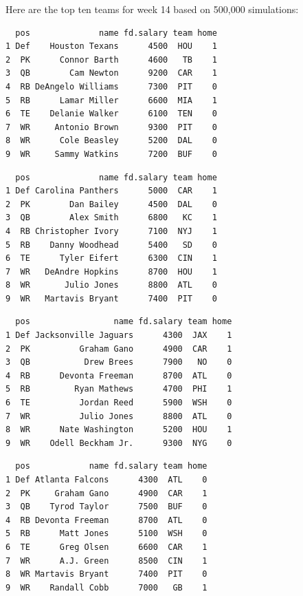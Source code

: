 \documentclass[10pt]{article}
\begin{document}
\thispagestyle{fancy}


\noindent Here are the top ten teams for week 14 based on 500,000 simulations:
\begin{lstlisting}
  pos              name fd.salary team home
1 Def    Houston Texans      4500  HOU    1
2  PK      Connor Barth      4600   TB    1
3  QB        Cam Newton      9200  CAR    1
4  RB DeAngelo Williams      7300  PIT    0
5  RB      Lamar Miller      6600  MIA    1
6  TE    Delanie Walker      6100  TEN    0
7  WR     Antonio Brown      9300  PIT    0
8  WR      Cole Beasley      5200  DAL    0
9  WR     Sammy Watkins      7200  BUF    0
\end{lstlisting}

\begin{lstlisting}
  pos              name fd.salary team home
1 Def Carolina Panthers      5000  CAR    1
2  PK        Dan Bailey      4500  DAL    0
3  QB        Alex Smith      6800   KC    1
4  RB Christopher Ivory      7100  NYJ    1
5  RB    Danny Woodhead      5400   SD    0
6  TE      Tyler Eifert      6300  CIN    1
7  WR   DeAndre Hopkins      8700  HOU    1
8  WR       Julio Jones      8800  ATL    0
9  WR   Martavis Bryant      7400  PIT    0
\end{lstlisting}

\begin{lstlisting}
  pos                 name fd.salary team home
1 Def Jacksonville Jaguars      4300  JAX    1
2  PK          Graham Gano      4900  CAR    1
3  QB           Drew Brees      7900   NO    0
4  RB      Devonta Freeman      8700  ATL    0
5  RB         Ryan Mathews      4700  PHI    1
6  TE          Jordan Reed      5900  WSH    0
7  WR          Julio Jones      8800  ATL    0
8  WR      Nate Washington      5200  HOU    1
9  WR    Odell Beckham Jr.      9300  NYG    0
\end{lstlisting}

\begin{lstlisting}
  pos            name fd.salary team home
1 Def Atlanta Falcons      4300  ATL    0
2  PK     Graham Gano      4900  CAR    1
3  QB    Tyrod Taylor      7500  BUF    0
4  RB Devonta Freeman      8700  ATL    0
5  RB      Matt Jones      5100  WSH    0
6  TE      Greg Olsen      6600  CAR    1
7  WR      A.J. Green      8500  CIN    1
8  WR Martavis Bryant      7400  PIT    0
9  WR    Randall Cobb      7000   GB    1
\end{lstlisting}
\end{document}
